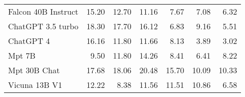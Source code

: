 \begin{table}[!htbp]
\begin{tabular}{l|rrr|rrr}
Falcon 40B Instruct & {\cellcolor[HTML]{EA4D9C}} \color[HTML]{F1F1F1} 15.20 & {\cellcolor[HTML]{FAA5B7}} \color[HTML]{000000} 12.70 & {\cellcolor[HTML]{FCCAC5}} \color[HTML]{000000} 11.16 & {\cellcolor[HTML]{BFE7DE}} \color[HTML]{000000} 7.67 & {\cellcolor[HTML]{CDECE6}} \color[HTML]{000000} 7.08 & {\cellcolor[HTML]{D6F0EE}} \color[HTML]{000000} 6.32 \\
ChatGPT 3.5 turbo & {\cellcolor[HTML]{91017A}} \color[HTML]{F1F1F1} 18.30 & {\cellcolor[HTML]{A5017D}} \color[HTML]{F1F1F1} 17.70 & {\cellcolor[HTML]{D82E94}} \color[HTML]{F1F1F1} 16.12 & {\cellcolor[HTML]{D0EDE9}} \color[HTML]{000000} 6.83 & {\cellcolor[HTML]{9AD8CA}} \color[HTML]{000000} 9.16 & {\cellcolor[HTML]{E0F3F5}} \color[HTML]{000000} 5.51 \\
ChatGPT 4 & {\cellcolor[HTML]{D62D93}} \color[HTML]{F1F1F1} 16.16 & {\cellcolor[HTML]{FBBBBD}} \color[HTML]{000000} 11.80 & {\cellcolor[HTML]{FCBFBE}} \color[HTML]{000000} 11.66 & {\cellcolor[HTML]{B4E2D8}} \color[HTML]{000000} 8.13 & {\cellcolor[HTML]{EFF9FB}} \color[HTML]{000000} 3.89 & {\cellcolor[HTML]{F7FCFD}} \color[HTML]{000000} 3.02 \\
Mpt 7B & {\cellcolor[HTML]{FEE6E3}} \color[HTML]{000000} 9.50 & {\cellcolor[HTML]{FBBBBD}} \color[HTML]{000000} 11.80 & {\cellcolor[HTML]{F76EA3}} \color[HTML]{F1F1F1} 14.26 & {\cellcolor[HTML]{ADE0D4}} \color[HTML]{000000} 8.41 & {\cellcolor[HTML]{D5EFED}} \color[HTML]{000000} 6.41 & {\cellcolor[HTML]{B2E2D7}} \color[HTML]{000000} 8.22 \\
Mpt 30B Chat & {\cellcolor[HTML]{A6017D}} \color[HTML]{F1F1F1} 17.68 & {\cellcolor[HTML]{99017B}} \color[HTML]{F1F1F1} 18.06 & {\cellcolor[HTML]{49006A}} \color[HTML]{F1F1F1} 20.48 & {\cellcolor[HTML]{1F8742}} \color[HTML]{F1F1F1} 15.70 & {\cellcolor[HTML]{84CFB9}} \color[HTML]{000000} 10.09 & {\cellcolor[HTML]{7DCCB5}} \color[HTML]{000000} 10.33 \\
Vicuna 13B V1 & {\cellcolor[HTML]{FBB0BA}} \color[HTML]{000000} 12.22 & {\cellcolor[HTML]{FFF7F3}} \color[HTML]{000000} 8.38 & {\cellcolor[HTML]{FCC1BF}} \color[HTML]{000000} 11.56 & {\cellcolor[HTML]{62C09F}} \color[HTML]{000000} 11.51 & {\cellcolor[HTML]{70C6AC}} \color[HTML]{000000} 10.86 & {\cellcolor[HTML]{D3EEEB}} \color[HTML]{000000} 6.58 \\

\end{tabular}
\end{table}
